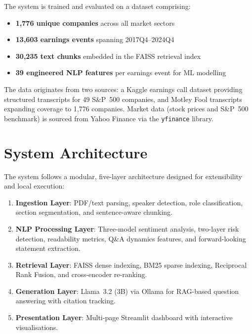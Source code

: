 \documentclass[12pt,a4paper]{article}
\begin{document}
The system is trained and evaluated on a dataset comprising:
\begin{itemize}[noitemsep]
    \item \textbf{1,776 unique companies} across all market sectors
    \item \textbf{13,603 earnings events} spanning 2017Q4--2024Q4
    \item \textbf{30,235 text chunks} embedded in the FAISS retrieval index
    \item \textbf{39 engineered NLP features} per earnings event for ML modelling
\end{itemize}

The data originates from two sources: a Kaggle earnings call dataset providing structured transcripts for 49 S\&P~500 companies, and Motley Fool transcripts expanding coverage to 1,776 companies. Market data (stock prices and S\&P~500 benchmark) is sourced from Yahoo Finance via the \texttt{yfinance} library.


\section{System Architecture}
\label{sec:architecture}

The system follows a modular, five-layer architecture designed for extensibility and local execution:

\begin{enumerate}[noitemsep]
    \item \textbf{Ingestion Layer}: PDF/text parsing, speaker detection, role classification, section segmentation, and sentence-aware chunking.
    \item \textbf{NLP Processing Layer}: Three-model sentiment analysis, two-layer risk detection, readability metrics, Q\&A dynamics features, and forward-looking statement extraction.
    \item \textbf{Retrieval Layer}: FAISS dense indexing, BM25 sparse indexing, Reciprocal Rank Fusion, and cross-encoder re-ranking.
    \item \textbf{Generation Layer}: Llama~3.2 (3B) via Ollama for RAG-based question answering with citation tracking.
    \item \textbf{Presentation Layer}: Multi-page Streamlit dashboard with interactive visualisations.
\end{enumerate}
\end{document}
